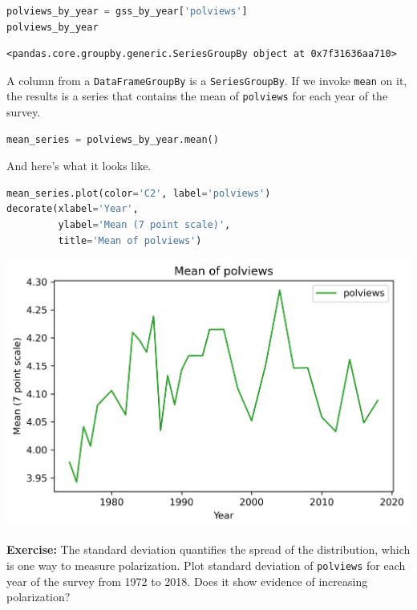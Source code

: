 \begin{lstlisting}[language=Python,style=source]
polviews_by_year = gss_by_year['polviews']
polviews_by_year
\end{lstlisting}

\begin{lstlisting}[style=output]
<pandas.core.groupby.generic.SeriesGroupBy object at 0x7f31636aa710>
\end{lstlisting}

A column from a \passthrough{\lstinline!DataFrameGroupBy!} is a
\passthrough{\lstinline!SeriesGroupBy!}. If we invoke
\passthrough{\lstinline!mean!} on it, the results is a series that
contains the mean of \passthrough{\lstinline!polviews!} for each year of
the survey.

\begin{lstlisting}[language=Python,style=source]
mean_series = polviews_by_year.mean()
\end{lstlisting}

And here's what it looks like.

\begin{lstlisting}[language=Python,style=source]
mean_series.plot(color='C2', label='polviews')
decorate(xlabel='Year', 
         ylabel='Mean (7 point scale)',
         title='Mean of polviews')
\end{lstlisting}

\begin{center}
\includegraphics[scale=0.75]{02_polviews_soln_files/02_polviews_soln_50_0.png}
\end{center}

\textbf{Exercise:} The standard deviation quantifies the spread of the
distribution, which is one way to measure polarization. Plot standard
deviation of \passthrough{\lstinline!polviews!} for each year of the
survey from 1972 to 2018. Does it show evidence of increasing
polarization?

